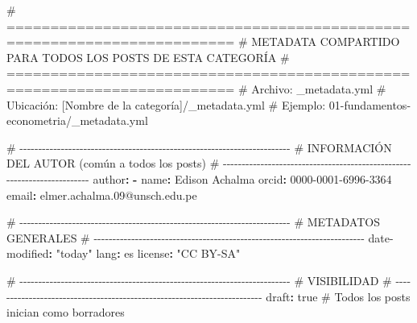 \documentclass[
  doc,
  floatsintext,
  longtable,
  a4paper,
  nolmodern,
  notxfonts,
  notimes,
  12pt,
  colorlinks=true,linkcolor=blue,citecolor=blue,urlcolor=blue]{apa7}
\newenvironment{Shaded}{\begin{snugshade}}{\end{snugshade}}
\newcommand{\AttributeTok}[1]{\textcolor[rgb]{0.40,0.45,0.13}{#1}}
\newcommand{\CharTok}[1]{\textcolor[rgb]{0.13,0.47,0.30}{#1}}
\newcommand{\CommentTok}[1]{\textcolor[rgb]{0.37,0.37,0.37}{#1}}
\newcommand{\FunctionTok}[1]{\textcolor[rgb]{0.28,0.35,0.67}{#1}}
\newcommand{\KeywordTok}[1]{\textcolor[rgb]{0.00,0.23,0.31}{\textbf{#1}}}
\newcommand{\StringTok}[1]{\textcolor[rgb]{0.13,0.47,0.30}{#1}}
\begin{document}
\begin{Shaded}
\begin{Highlighting}[]
\CommentTok{\# ========================================================================}
\CommentTok{\# METADATA COMPARTIDO PARA TODOS LOS POSTS DE ESTA CATEGORÍA}
\CommentTok{\# ========================================================================}
\CommentTok{\# Archivo: \_metadata.yml}
\CommentTok{\# Ubicación: [Nombre de la categoría]/\_metadata.yml}
\CommentTok{\# Ejemplo: 01{-}fundamentos{-}econometria/\_metadata.yml}

\CommentTok{\# {-}{-}{-}{-}{-}{-}{-}{-}{-}{-}{-}{-}{-}{-}{-}{-}{-}{-}{-}{-}{-}{-}{-}{-}{-}{-}{-}{-}{-}{-}{-}{-}{-}{-}{-}{-}{-}{-}{-}{-}{-}{-}{-}{-}{-}{-}{-}{-}{-}{-}{-}{-}{-}{-}{-}{-}{-}{-}{-}{-}{-}{-}{-}{-}{-}{-}{-}{-}{-}{-}{-}{-}}
\CommentTok{\# INFORMACIÓN DEL AUTOR (común a todos los posts)}
\CommentTok{\# {-}{-}{-}{-}{-}{-}{-}{-}{-}{-}{-}{-}{-}{-}{-}{-}{-}{-}{-}{-}{-}{-}{-}{-}{-}{-}{-}{-}{-}{-}{-}{-}{-}{-}{-}{-}{-}{-}{-}{-}{-}{-}{-}{-}{-}{-}{-}{-}{-}{-}{-}{-}{-}{-}{-}{-}{-}{-}{-}{-}{-}{-}{-}{-}{-}{-}{-}{-}{-}{-}{-}{-}}
\FunctionTok{author}\KeywordTok{:}
\AttributeTok{  }\KeywordTok{{-}}\AttributeTok{ }\FunctionTok{name}\KeywordTok{:}\AttributeTok{ Edison Achalma}
\AttributeTok{    }\FunctionTok{orcid}\KeywordTok{:}\AttributeTok{ 0000{-}0001{-}6996{-}3364}
\AttributeTok{    }\FunctionTok{email}\KeywordTok{:}\AttributeTok{ elmer.achalma.09@unsch.edu.pe}

\CommentTok{\# {-}{-}{-}{-}{-}{-}{-}{-}{-}{-}{-}{-}{-}{-}{-}{-}{-}{-}{-}{-}{-}{-}{-}{-}{-}{-}{-}{-}{-}{-}{-}{-}{-}{-}{-}{-}{-}{-}{-}{-}{-}{-}{-}{-}{-}{-}{-}{-}{-}{-}{-}{-}{-}{-}{-}{-}{-}{-}{-}{-}{-}{-}{-}{-}{-}{-}{-}{-}{-}{-}{-}{-}}
\CommentTok{\# METADATOS GENERALES}
\CommentTok{\# {-}{-}{-}{-}{-}{-}{-}{-}{-}{-}{-}{-}{-}{-}{-}{-}{-}{-}{-}{-}{-}{-}{-}{-}{-}{-}{-}{-}{-}{-}{-}{-}{-}{-}{-}{-}{-}{-}{-}{-}{-}{-}{-}{-}{-}{-}{-}{-}{-}{-}{-}{-}{-}{-}{-}{-}{-}{-}{-}{-}{-}{-}{-}{-}{-}{-}{-}{-}{-}{-}{-}{-}}
\FunctionTok{date{-}modified}\KeywordTok{:}\AttributeTok{ }\StringTok{"today"}
\FunctionTok{lang}\KeywordTok{:}\AttributeTok{ es}
\FunctionTok{license}\KeywordTok{:}\AttributeTok{ }\StringTok{"CC BY{-}SA"}

\CommentTok{\# {-}{-}{-}{-}{-}{-}{-}{-}{-}{-}{-}{-}{-}{-}{-}{-}{-}{-}{-}{-}{-}{-}{-}{-}{-}{-}{-}{-}{-}{-}{-}{-}{-}{-}{-}{-}{-}{-}{-}{-}{-}{-}{-}{-}{-}{-}{-}{-}{-}{-}{-}{-}{-}{-}{-}{-}{-}{-}{-}{-}{-}{-}{-}{-}{-}{-}{-}{-}{-}{-}{-}{-}}
\CommentTok{\# VISIBILIDAD}
\CommentTok{\# {-}{-}{-}{-}{-}{-}{-}{-}{-}{-}{-}{-}{-}{-}{-}{-}{-}{-}{-}{-}{-}{-}{-}{-}{-}{-}{-}{-}{-}{-}{-}{-}{-}{-}{-}{-}{-}{-}{-}{-}{-}{-}{-}{-}{-}{-}{-}{-}{-}{-}{-}{-}{-}{-}{-}{-}{-}{-}{-}{-}{-}{-}{-}{-}{-}{-}{-}{-}{-}{-}{-}{-}}
\FunctionTok{draft}\KeywordTok{:}\AttributeTok{ }\CharTok{true}\CommentTok{          \# Todos los posts inician como borradores}


\end{Highlighting}
\end{Shaded}
\end{document}
